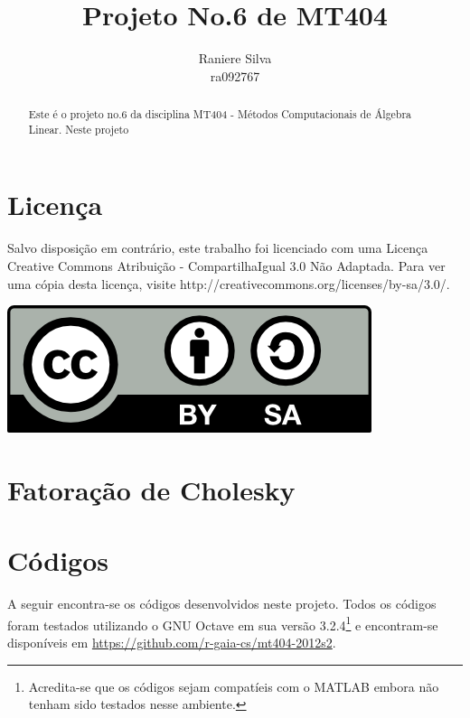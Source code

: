 \documentclass[12pt,a4paper]{article}
\begin{document}
\title{Projeto No.6 de MT404}
\author{Raniere Silva \\ ra092767}
\maketitle
\begin{abstract}
    Este \'{e} o projeto no.6 da disciplina MT404 - M\'{e}todos Computacionais
    de \'{A}lgebra Linear. Neste projeto 
\end{abstract}
\tableofcontents
\lstlistoflistings
\section*{Licen\c{c}a}
Salvo disposi\c{c}\~{a}o em contr\'{a}rio, este trabalho foi licenciado com uma
Licen\c{c}a Creative Commons Atribui\c{c}\~{a}o - CompartilhaIgual 3.0 N\~{a}o
Adaptada. Para ver uma c\'{o}pia desta licen\c{c}a, visite
http://creativecommons.org/licenses/by-sa/3.0/.
\begin{center}
    \includegraphics{../figuras/cc-by-sa.png}
\end{center}
\newpage
\section{Fatora\c{c}\~{a}o de Cholesky}

\section{C\'{o}digos}
A seguir encontra-se os c\'{o}digos desenvolvidos neste projeto. Todos os c\'{o}digos
foram testados utilizando o GNU Octave em sua vers\~{a}o
3.2.4\footnote{Acredita-se que os c\'{o}digos sejam compat\'{i}eis com o MATLAB
embora n\~{a}o tenham sido testados nesse ambiente.} e encontram-se
dispon\'{i}veis em \url{https://github.com/r-gaia-cs/mt404-2012s2}.




\end{document}

